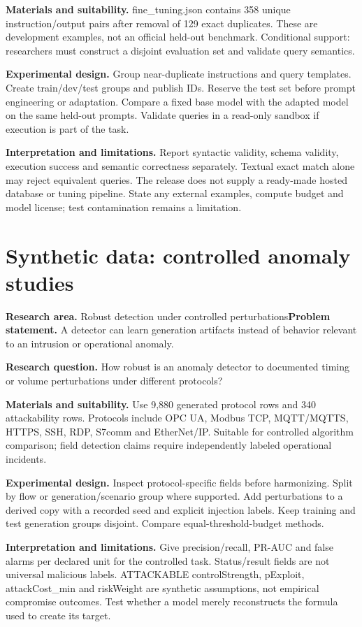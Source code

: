 \textbf{Materials and suitability.} fine\_tuning.json contains 358 unique instruction/output pairs after removal of 129 exact duplicates. These are development examples, not an official held-out benchmark. Conditional support: researchers must construct a disjoint evaluation set and validate query semantics.

\textbf{Experimental design.} Group near-duplicate instructions and query templates. Create train/dev/test groups and publish IDs. Reserve the test set before prompt engineering or adaptation. Compare a fixed base model with the adapted model on the same held-out prompts. Validate queries in a read-only sandbox if execution is part of the task.

\textbf{Interpretation and limitations.} Report syntactic validity, schema validity, execution success and semantic correctness separately. Textual exact match alone may reject equivalent queries. The release does not supply a ready-made hosted database or tuning pipeline. State any external examples, compute budget and model license; test contamination remains a limitation.

\clearpage\section{Synthetic data: controlled anomaly studies}
\textbf{Research area.} Robust detection under controlled perturbations\newline \textbf{Problem statement.} A detector can learn generation artifacts instead of behavior relevant to an intrusion or operational anomaly.

\textbf{Research question.} How robust is an anomaly detector to documented timing or volume perturbations under different protocols?

\textbf{Materials and suitability.} Use 9,880 generated protocol rows and 340 attackability rows. Protocols include OPC UA, Modbus TCP, MQTT/MQTTS, HTTPS, SSH, RDP, S7comm and EtherNet/IP. Suitable for controlled algorithm comparison; field detection claims require independently labeled operational incidents.

\textbf{Experimental design.} Inspect protocol-specific fields before harmonizing. Split by flow or generation/scenario group where supported. Add perturbations to a derived copy with a recorded seed and explicit injection labels. Keep training and test generation groups disjoint. Compare equal-threshold-budget methods.

\textbf{Interpretation and limitations.} Give precision/recall, PR-AUC and false alarms per declared unit for the controlled task. Status/result fields are not universal malicious labels. ATTACKABLE controlStrength, pExploit, attackCost\_min and riskWeight are synthetic assumptions, not empirical compromise outcomes. Test whether a model merely reconstructs the formula used to create its target.

